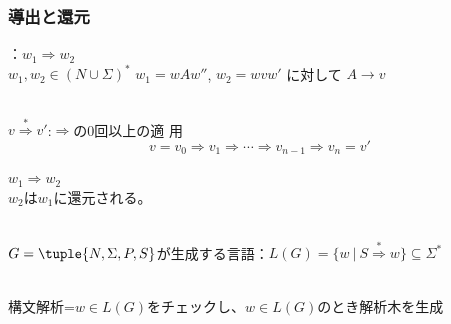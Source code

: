 \documentclass[dvipdfmx]{beamer}
\begin{document}
\begin{frame}
 \frametitle{導出と還元}
 \begin{list}{}{\setlength{\itemsep}{5pt}}
  \item [\bluetext{{\bf 導出}}]：$w_1\Rightarrow w_2$\\
	$w_1,w_2\in (N\cup\Sigma)^\ast$
	$w_1=wAw''$, $w_2=wvw'$ に対して $A\rightarrow v$
  \item [\bluetext{{\bf 導出関係}}]\ \\
	$v\stackrel{\ast}{\Rightarrow} v'$:$\Rightarrow$の0回以上の適
	用
	\[
	 v=v_0\Rightarrow v_1\Rightarrow\cdots\Rightarrow
	v_{n-1}\Rightarrow v_n=v'
	\]
  \item [\bluetext{\bf 還元}] $w_1\Rightarrow w_2$\\
	$w_2$は$w_1$に還元される。
  \item [\bluetext{\bf 生成言語}]\ \\
	$G=\tuple{N,\Sigma,P,S}$が生成する言語：$L(G)=\{w\ |\
	S\stackrel{\ast}{\Rightarrow}w\}\subseteq \Sigma^\ast$
 \end{list}
 \\
 構文解析=$w\in L(G)$をチェックし、$w\in L(G)$のとき解析木を生成
\end{frame}
\end{document}
